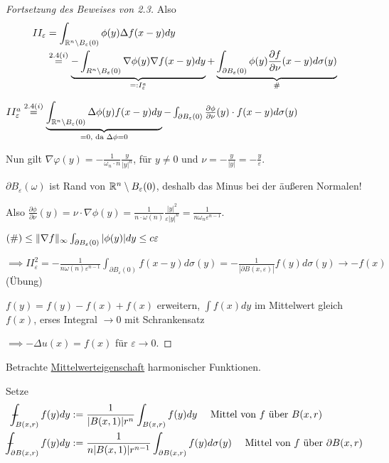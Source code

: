 \begin{proof}[Fortsetzung des Beweises von 2.3]
  Also 
  \begin{align*}
    II_\varepsilon 
    &= \int_{\mathbb{R}^n \setminus B_\varepsilon(0)} \phi(y) \Delta f(x - y) dy\\
    &\overset{2.4(i)}{=} \underbrace{-\int_{R^n \setminus B_\varepsilon(0)} \nabla \phi(y) \nabla f(x - y) dy}_{=: I_\varepsilon^a}  +  \underbrace{\int_{\partial B_\varepsilon(0)} \phi(y) \frac{\partial f}{\partial \nu}(x - y) d\sigma(y)}_{\#}
  \end{align*}

  $II_\varepsilon^a \overset{2.4(i)}{=} \underbrace{\int_{\mathbb{R}^n \setminus B_\varepsilon(0)} \Delta \phi(y) f(x - y) dy}_{= 0, \text{ da } \Delta \phi = 0} - \int_{\partial B_\varepsilon(0)} \frac{\partial \phi}{\partial \nu}(y) \cdot f(x - y) d\sigma(y)$

  Nun gilt $\nabla \varphi(y) = - \frac{1}{\omega_n \cdot n} \frac{y}{|y|^n}$, für $y \neq 0$ und $\nu = -\frac{y}{|y|} = - \frac{y}{\varepsilon}$.

  {\tiny{$\partial B_\varepsilon(\omega)$ ist Rand von $\mathbb{R}^n \setminus B_\varepsilon(0)$, deshalb das Minus bei der äußeren Normalen! }}

  Also $\frac{\partial \phi}{\partial \nu}(y) = \nu \cdot \nabla \phi(y) = \frac{1}{n \cdot \omega(n)} \frac{|y|^2}{\varepsilon |y|^n} = \frac{1}{n \omega_n \varepsilon^{n - 1}}$.

  {\tiny{$(\#) \leq \lVert \nabla f \rVert_\infty \int_{\partial B_\varepsilon(0)} |\phi(y) | dy \leq c \varepsilon$}}

  $\implies II_\varepsilon^2 = - \frac{1}{n \omega(n) \varepsilon^{n - 1}} \int_{\partial B_\varepsilon(0)} f(x - y) d \sigma(y) = -\frac{1}{|\partial B(x, \varepsilon)|} f(y) d\sigma(y) \to -f(x)$ (Übung)

  {\tiny{$f(y) = f(y) - f(x) + f(x)$ erweitern, $\int f(x) dy$ im Mittelwert gleich $f(x)$, erses Integral $\to 0$ mit Schrankensatz}}

  $\implies -\Delta u(x) = f(x)$ für $\varepsilon \to 0$.
\end{proof}

Betrachte \underline{Mittelwerteigenschaft} harmonischer Funktionen.

Setze 
\begin{align*} 
  \dashint_{B(x,r)} f(y) dy &:= \frac{1}{|B(x,1)| r^n} \int_{B(x,r)} f(y) dy \quad\text{ Mittel von $f$ über $B(x,r)$} \\
  \dashint_{\partial B(x,r)} f(y) dy &:= \frac{1}{n |B(x,1)|r^{n-1}} \int_{\partial B(x,r)} f(y) d\sigma(y) \quad\text{ Mittel von $f$ über $\partial B(x,r)$}
\end{align*}

